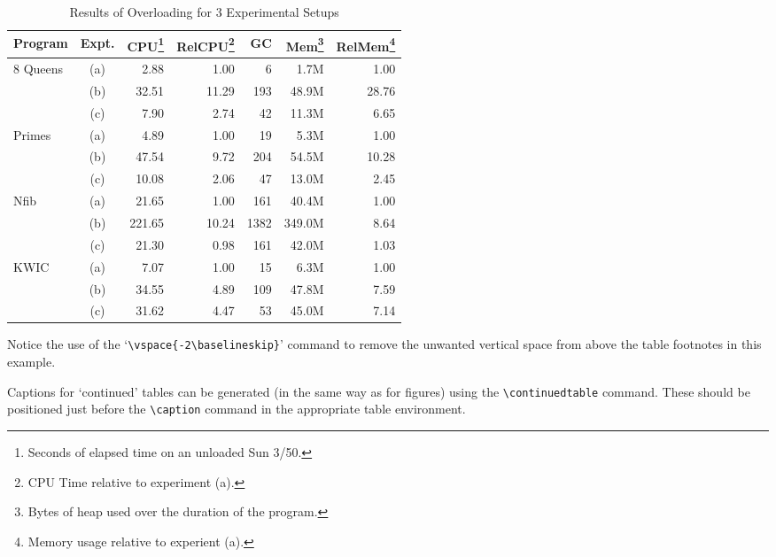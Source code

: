 \documentclass{jfp}
\begin{document}
%
\begin{table}
  \caption{Results of Overloading for 3 Experimental Setups}
  \label{sample-table}
  \begin{minipage}{\textwidth}
    \begin{tabular}{lcrrrrr}
      \hline\hline
      Program& Expt.&
      CPU\footnote{Seconds of elapsed time on an unloaded Sun 3/50.}&
      RelCPU\footnote{CPU Time relative to experiment (a).}& GC&
      Mem\footnote{Bytes of heap used over the duration of the program.}&
      RelMem\footnote{Memory usage relative to experient (a).}\\
      \hline
      8 Queens& (a)&   2.88&  1.00&    6&   1.7M&  1.00\\
      &         (b)&  32.51& 11.29&  193&  48.9M& 28.76\\
      &         (c)&   7.90&  2.74&   42&  11.3M&  6.65\\
      \noalign{\vspace {.5cm}}
      Primes&   (a)&   4.89&  1.00&   19&   5.3M&  1.00\\
      &         (b)&  47.54&  9.72&  204&  54.5M& 10.28\\
      &         (c)&  10.08&  2.06&   47&  13.0M&  2.45\\
      \noalign{\vspace {.5cm}}
      Nfib&     (a)&  21.65&  1.00&  161&  40.4M&  1.00\\
      &         (b)& 221.65& 10.24& 1382& 349.0M&  8.64\\
      &         (c)&  21.30&  0.98&  161&  42.0M&  1.03\\
      \noalign{\vspace {.5cm}}
      KWIC&     (a)&   7.07&  1.00&   15&   6.3M&  1.00\\
      &         (b)&  34.55&  4.89&  109&  47.8M&  7.59\\
      &         (c)&  31.62&  4.47&   53&  45.0M&  7.14\\
      \hline\hline
    \end{tabular}
    \vspace{-2\baselineskip}
  \end{minipage}
\end{table}

Notice the use of the `\verb"\vspace{-2\baselineskip}"' command to remove the
unwanted vertical space from above the table footnotes in this example.

Captions for `continued' tables can be generated (in the same way as for figures)
using the \verb"\continuedtable" command. These should be positioned just before
the \verb"\caption" command in the appropriate table environment.
\end{document}
